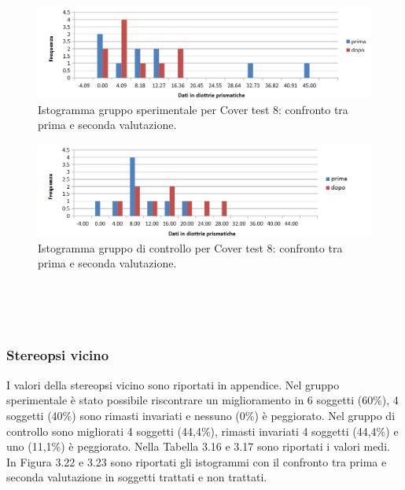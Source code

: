 \begin{table}
\begin{minipage}{0.48\textwidth}
 \label{tab:ompdiff} 
\end{minipage}
\end{table}
 \begin{figure}[h!]
	\centering
	\includegraphics[scale=0.38]{source/grafici/cover_test_8_trattati_nuovo.png}
	\caption[Istogramma gruppo sperimentale per Cover test 8]{Istogramma gruppo sperimentale per Cover test 8: confronto tra prima e seconda valutazione.}
	\label{fig:issuexample}
\end{figure}
 \begin{figure}[h!]
	\centering
	\includegraphics[scale=0.38]{source/grafici/cover_test_8_giustissimo_non_trattati.png}
	\caption[Istogramma gruppo di controllo per Cover test 8]{Istogramma gruppo di controllo per Cover test 8: confronto tra prima e seconda valutazione.}
	\label{fig:issuexample}
\end{figure}
\\\ \\\
\subsubsection{Stereopsi vicino}

I valori della stereopsi vicino sono riportati in appendice. Nel gruppo sperimentale è stato possibile riscontrare un miglioramento in 6 soggetti (60\%), 4 soggetti (40\%) sono rimasti invariati e nessuno (0\%) è peggiorato. Nel gruppo di controllo sono migliorati 4 soggetti (44,4\%), rimasti invariati 4 soggetti (44,4\%) e uno (11,1\%) è peggiorato. Nella Tabella 3.16 e 3.17 sono riportati i valori medi. In Figura 3.22 e 3.23 sono riportati gli istogrammi con il confronto tra prima e seconda valutazione in soggetti trattati e non trattati.

